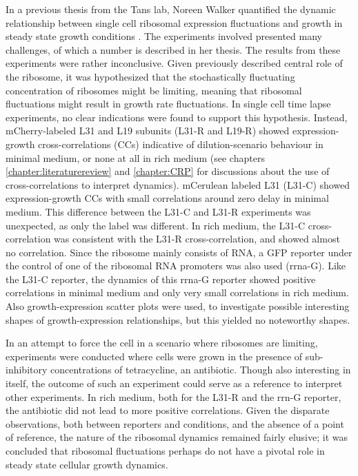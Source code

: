 In a previous thesis from the Tans lab, Noreen Walker 
quantified the dynamic relationship between single cell ribosomal expression fluctuations and growth in steady state growth conditions \cite{Walker2016t}.
%
The experiments involved presented many challenges, 
of which a number is described in her thesis.
%
The results from these experiments were rather inconclusive.
%
Given previously described central role of the ribosome, 
it was hypothesized that the stochastically fluctuating concentration of ribosomes might be limiting, 
meaning that ribosomal fluctuations might result in growth rate fluctuations.
%
In single cell time lapse experiments, no clear indications were found to support this hypothesis.
%
Instead, mCherry-labeled L31 and L19 subunits (L31-R and L19-R) showed expression-growth cross-correlations (CCs) indicative of dilution-scenario behaviour in minimal medium, or none at all in rich medium (see chapters \ref{chapter:literaturereview} and \ref{chapter:CRP} for discussions about the use of cross-correlations to interpret dynamics). 
mCerulean labeled L31 (L31-C) showed expression-growth CCs with small correlations around zero delay 
in minimal medium.
This difference between the L31-C and L31-R experiments was unexpected, as only the label was different.
%
In rich medium, the L31-C cross-correlation was consistent with the L31-R cross-correlation, and showed almost no correlation.
%
Since the ribosome mainly consists of RNA, 
a GFP reporter under the control of one of the ribosomal RNA promoters was also used (rrna-G).
Like the L31-C reporter, the dynamics of this rrna-G reporter showed positive correlations in minimal medium and only very small correlations in rich medium.
%
Also growth-expression scatter plots were used, to investigate possible interesting shapes of growth-expression relationships, but this yielded no noteworthy shapes.

In an attempt to force the cell in a scenario where ribosomes are limiting, experiments were conducted where cells were grown in the presence of sub-inhibitory concentrations of tetracycline, an antibiotic.
%
Though also interesting in itself, the outcome of such an experiment could serve as a reference to interpret other experiments.
%
In rich medium, both for the L31-R and the rrn-G reporter, the antibiotic did not lead to more positive correlations.
%
Given the disparate observations, both between reporters and conditions, 
and the absence of a point of reference,
the nature of the ribosomal dynamics remained fairly elusive; it was concluded that ribosomal fluctuations perhaps do not have a pivotal role in steady state cellular growth dynamics.

